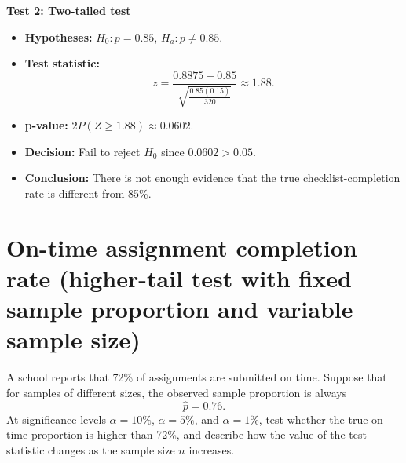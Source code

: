 
\textbf{Test 2: Two-tailed test}

\begin{itemize}
	\item \textbf{Hypotheses:} \(H_0\colon p=0.85\), \(H_a\colon p\ne0.85\).
	\item \textbf{Test statistic:}
	\[
	z=\frac{0.8875-0.85}{\sqrt{\frac{0.85(0.15)}{320}}}\approx 1.88.
	\]
	\item \textbf{p-value:} \(2P(Z\ge 1.88)\approx 0.0602\).
	\item \textbf{Decision:} Fail to reject \(H_0\) since \(0.0602>0.05\).
	\item \textbf{Conclusion:} There is not enough evidence that the true checklist-completion rate is different from 85\%.
\end{itemize}

\begin{center}
\end{center}


\section{On-time assignment completion rate (higher-tail test with fixed sample proportion and variable sample size)}
A school reports that 72\% of assignments are submitted on time. Suppose that for samples of different sizes, the observed sample proportion is always
\[
\hat p=0.76.
\]
At significance levels \(\alpha=10\%\), \(\alpha=5\%\), and \(\alpha=1\%\), test whether the true on-time proportion is higher than 72\%, and describe how the value of the test statistic changes as the sample size \(n\) increases.

